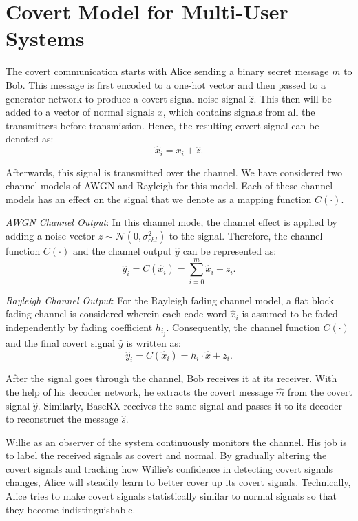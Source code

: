 \section{Covert Model for Multi-User Systems}
The covert communication starts with Alice sending a binary secret message \(m\) to Bob. This message is first encoded to a one-hot vector and then passed to a generator network to produce a covert signal noise signal \(\hat{z}\). This then will be added to a vector of normal signals \(x\), which contains signals from all the transmitters before transmission. Hence, the resulting covert signal can be denoted as:
\begin{equation}
	\hat{x}_i = x_i + \hat{z}.
\end{equation}

Afterwards, this signal is transmitted over the channel. We have considered two channel models of AWGN and Rayleigh for this model. Each of these channel models has an effect on the signal that we denote as a mapping function \(C(\cdot)\).

\textit{AWGN Channel Output}: In this channel mode, the channel effect is applied by adding a noise vector \(z \sim \mathcal{N}(0, \sigma_{chl}^2)\) to the signal. Therefore, the channel function \(C(\cdot)\) and the channel output \(\hat{y}\) can be represented as:
\begin{equation}
	\hat{y}_i = C(\hat{x}_i) = \sum_{i=0}^{m}\hat{x}_i + z_i.
\end{equation}

\textit{Rayleigh Channel Output}: For the Rayleigh fading channel model, a flat block fading channel is considered wherein each code-word \(\hat{x}_i\) is assumed to be faded independently by fading coefficient \(h_{i_j}\). Consequently, the channel function \(C(\cdot)\) and the final covert signal \(\hat{y}\) is written as:
\begin{equation}
	\hat{y}_i = C(\hat{x}_i) = h_i \cdot \hat{x} + z_i.
\end{equation}

After the signal goes through the channel, Bob receives it at its receiver. With the help of his decoder network, he extracts the covert message \(\hat{m}\) from the covert signal \(\hat{y}\). Similarly, BaseRX receives the same signal and passes it to its decoder to reconstruct the message \(\hat{s}\).

Willie as an observer of the system continuously monitors the channel. His job is to label the received signals as covert and normal. By gradually altering the covert signals and tracking how Willie's confidence in detecting covert signals changes, Alice will steadily learn to better cover up its covert signals. Technically, Alice tries to make covert signals statistically similar to normal signals so that they become indistinguishable.

